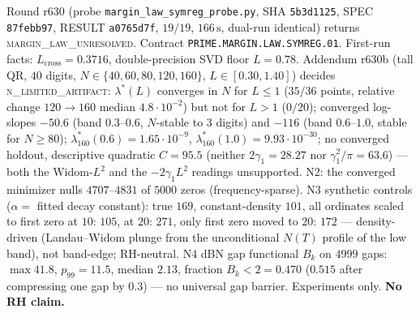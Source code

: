 \documentclass[11pt]{article}
\theoremstyle{definition}
\theoremstyle{remark}
\begin{document}
\noindent Round r630 (probe \texttt{margin\_law\_symreg\_probe.py},
SHA \texttt{5b3d1125}, SPEC \texttt{87febb97}, RESULT
\texttt{a0765d7f}, $19/19$, $166\,\mathrm{s}$, dual-run
identical) returns \textsc{margin\_law\_unresolved}.  Contract
\texttt{PRIME.MARGIN.LAW.SYMREG.01}.  First-run facts:
$L_{\mathrm{cross}}=0.3716$, double-precision SVD floor
$L=0.78$.  Addendum r630b (tall QR, $40$ digits,
$N\in\{40,60,80,120,160\}$, $L\in[0.30,1.40]$) decides
\textsc{n\_limited\_artifact}: $\lambda^*(L)$ converges in $N$
for $L\le 1$ ($35/36$ points, relative change $120\to 160$
median $4.8\cdot10^{-2}$) but not for $L>1$ ($0/20$);
converged log-slopes $-50.6$ (band $0.3$--$0.6$, $N$-stable
to $3$ digits) and $-116$ (band $0.6$--$1.0$, stable for
$N\ge 80$); $\lambda^*_{160}(0.6)=1.65\cdot10^{-9}$,
$\lambda^*_{160}(1.0)=9.93\cdot10^{-30}$; no converged
holdout, descriptive quadratic $C=95.5$ (neither
$2\gamma_1=28.27$ nor $\gamma_1^2/\pi=63.6$) --- both the
Widom-$L^2$ and the $-2\gamma_1 L^2$ readings unsupported.
N2: the converged minimizer nulls $4707$--$4831$ of $5000$
zeros (frequency-sparse).  N3 synthetic controls
($\alpha=$ fitted decay constant): true $169$,
constant-density $101$, all ordinates scaled to first zero
at $10$: $105$, at $20$: $271$, only first zero moved to
$20$: $172$ --- density-driven (Landau--Widom plunge from the
unconditional $N(T)$ profile of the low band), not
band-edge; RH-neutral.  N4 dBN gap functional $B_k$ on
$4999$ gaps: $\max 41.8$, $p_{99}=11.5$, median $2.13$,
fraction $B_k<2=0.470$ ($0.515$ after compressing one gap
by $0.3$) --- no universal gap barrier.  Experiments only.
\textbf{No RH claim.}
\end{document}
